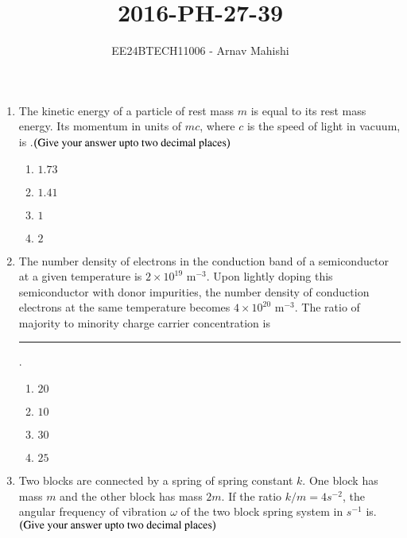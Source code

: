 \documentclass[journal]{IEEEtran}
\begin{document}

\vspace{3cm}

\title{2016-PH-27-39}
\author{EE24BTECH11006 - Arnav Mahishi}
{\let\newpage\relax\maketitle}
\begin{enumerate}
\item{
The kinetic energy of a particle of rest mass $m$ is equal to its rest mass energy. Its momentum in units of $mc$, where $c$ is the speed of light in vacuum, is .$\left(\text{Give your answer upto two decimal places}\right)$
\begin{multicols}{4}
\begin{enumerate}
\item $1.73$
\item $1.41$
\item $1$
\item $2$
\end{enumerate}
\end{multicols}
}
\item{
The number density of electrons in the conduction band of a semiconductor at a given temperature is $2 \times 10^{19} \text{ m}^{-3}$. Upon lightly doping this semiconductor with donor impurities, the number density of conduction electrons at the same temperature becomes $4 \times 10^{20} \text{ m}^{-3}$. The ratio of majority to minority charge carrier concentration is \rule{3cm}{0.15mm}.
\begin{multicols}{2}
\begin{enumerate}
\item $20$ 
\item $10$
\item $30$
\item $25$
\end{enumerate}
\end{multicols}}
\item{
Two blocks are connected by a spring of spring constant $k$. One block has mass $m$ and the other block has mass $2m$. If the ratio $k/m=4s^{-2}$, the angular frequency of vibration $\omega$ of the two block spring system in $s^{-1}$
is. $\left(\text{Give your answer upto two decimal places}\right)$
\begin{multicols}{4}

\end{multicols}}
\end{enumerate}
\end{document}
